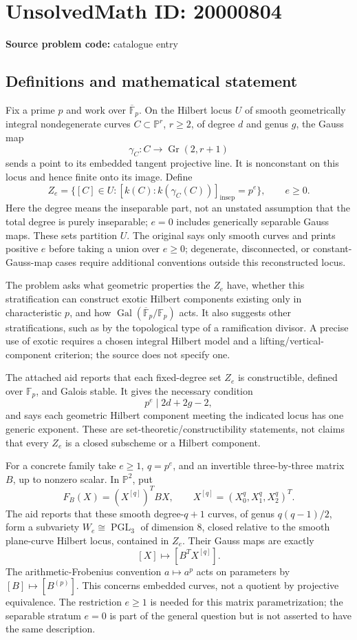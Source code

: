 \documentclass[11pt]{article}
\newcommand{\F}{\mathbb{F}}
\newcommand{\PP}{\mathbb{P}}
\begin{document}
\section*{UnsolvedMath ID: 20000804}
\textbf{Source problem code:} catalogue entry
\subsection{Definitions and mathematical statement}
Fix a prime \(p\) and work over \(\overline{\F}_p\). On the Hilbert locus \(U\) of smooth geometrically integral nondegenerate curves \(C\subset\PP^r\), \(r\geq2\), of degree \(d\) and genus \(g\), the Gauss map
\[
\gamma_C:C\to\operatorname{Gr}(2,r+1)
\]
sends a point to its embedded tangent projective line. It is nonconstant on this locus and hence finite onto its image. Define
\[
Z_e=\{[C]\in U:[k(C):k(\gamma_C(C))]_{\mathrm{insep}}=p^e\},
\qquad e\geq0.
\]
Here the degree means the inseparable part, not an unstated assumption that the total degree is purely inseparable; \(e=0\) includes generically separable Gauss maps. These sets partition \(U\). The original says only smooth curves and prints positive \(e\) before taking a union over \(e\geq0\); degenerate, disconnected, or constant-Gauss-map cases require additional conventions outside this reconstructed locus.

The problem asks what geometric properties the \(Z_e\) have, whether this stratification can construct exotic Hilbert components existing only in characteristic \(p\), and how \(\operatorname{Gal}(\overline{\F}_p/\F_p)\) acts. It also suggests other stratifications, such as by the topological type of a ramification divisor. A precise use of exotic requires a chosen integral Hilbert model and a lifting/vertical-component criterion; the source does not specify one.

The attached aid reports that each fixed-degree set \(Z_e\) is constructible, defined over \(\F_p\), and Galois stable. It gives the necessary condition
\[
p^e\mid 2d+2g-2,
\]
and says each geometric Hilbert component meeting the indicated locus has one generic exponent. These are set-theoretic/constructibility statements, not claims that every \(Z_e\) is a closed subscheme or a Hilbert component.

For a concrete family take \(e\geq1\), \(q=p^e\), and an invertible three-by-three matrix \(B\), up to nonzero scalar. In \(\PP^2\), put
\[
F_B(X)=(X^{[q]})^TBX,
\qquad X^{[q]}=(X_0^q,X_1^q,X_2^q)^T.
\]
The aid reports that these smooth degree-\(q+1\) curves, of genus \(q(q-1)/2\), form a subvariety \(W_e\cong\operatorname{PGL}_3\) of dimension \(8\), closed relative to the smooth plane-curve Hilbert locus, contained in \(Z_e\). Their Gauss maps are exactly
\[
[X]\longmapsto[B^TX^{[q]}].
\]
The arithmetic-Frobenius convention \(a\mapsto a^p\) acts on parameters by \([B]\mapsto[B^{(p)}]\). This concerns embedded curves, not a quotient by projective equivalence. The restriction \(e\geq1\) is needed for this matrix parametrization; the separable stratum \(e=0\) is part of the general question but is not asserted to have the same description.
\end{document}
